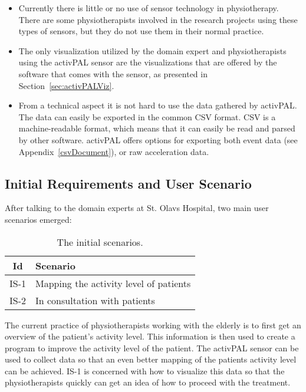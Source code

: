 \begin{itemize}
\item Currently there is little or no use of sensor technology in physiotherapy. There are some physiotherapists involved in the research projects using these types of sensors, but they do not use them in their normal practice. 

\item The only visualization utilized by the domain expert and physiotherapists using the activPAL sensor are the visualizations that are offered by the software that comes with the sensor, as presented in Section~\ref{sec:activPALViz}.

\item From a technical aspect it is not hard to use the data gathered by activPAL. The data can easily be exported in the common CSV format. CSV is a machine-readable format, which means that it can easily be read and parsed by other software. activPAL offers options for exporting both event data (see Appendix~\ref{csvDocument}), or raw acceleration data.

\end{itemize}

\subsection{Initial Requirements and User Scenario}
After talking to the domain experts at St. Olavs Hospital, two main user scenarios emerged:

\begin{table}[!h]
  \centering
  \begin{tabular}{|c|l|}
    \hline
    \textbf{Id} & \textbf{Scenario} \\ \hline
    IS-1 & Mapping the activity level of patients \\ \hline
    IS-2 & In consultation with patients \\ \hline
  \end{tabular}
  \caption[Initial scenarios]{The initial scenarios.}
\end{table}

The current practice of physiotherapists working with the elderly is to first get an overview of the patient's activity level. This information is then used to create a program to improve the activity level of the patient. The activPAL sensor can be used to collect data so that an even better mapping of the patients activity level can be achieved. IS-1 is concerned with how to visualize this data so that the physiotherapists quickly can get an idea of how to proceed with the treatment.

